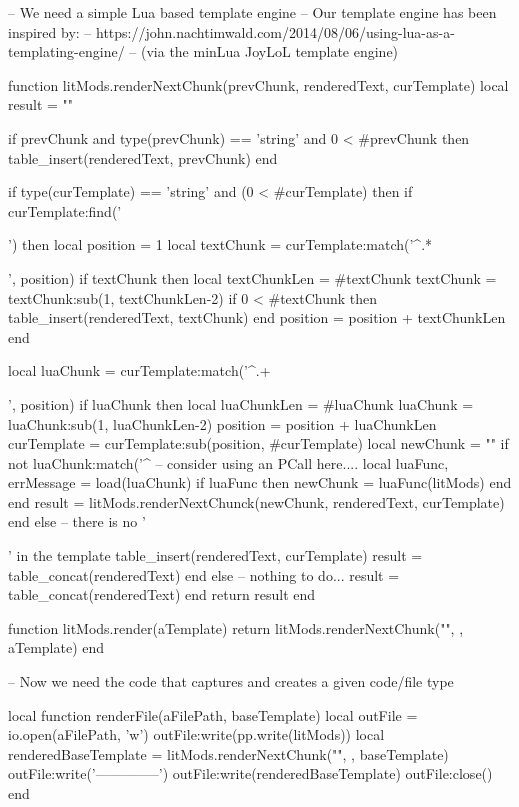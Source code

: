 
\startchapter[title=The Lua Rendering Engine]

\startLuaCode

-- We need a simple Lua based template engine
-- Our template engine has been inspired by:
--   https://john.nachtimwald.com/2014/08/06/using-lua-as-a-templating-engine/
-- (via the minLua JoyLoL template engine)

function litMods.renderNextChunk(prevChunk, renderedText, curTemplate)
  local result = ""
  
  if prevChunk
    and type(prevChunk) == 'string'
    and 0 < #prevChunk then
    table_insert(renderedText, prevChunk)
  end
  
  if type(curTemplate) == 'string' and (0 < #curTemplate) then
    if curTemplate:find('{{') then
      local position  = 1
      local textChunk = curTemplate:match('^.*{{', position)
      if textChunk then 
        local textChunkLen = #textChunk
        textChunk = textChunk:sub(1, textChunkLen-2)
        if 0 < #textChunk then table_insert(renderedText, textChunk) end
        position = position + textChunkLen
      end
      
      local luaChunk = curTemplate:match('^.+}}', position)
      if luaChunk then
        local luaChunkLen = #luaChunk
        luaChunk = luaChunk:sub(1, luaChunkLen-2)
        position = position + luaChunkLen
        curTemplate = curTemplate:sub(position, #curTemplate)
        local newChunk = ""
        if not luaChunk:match('^%
          -- consider using an PCall here....
          local luaFunc, errMessage = load(luaChunk)
          if luaFunc then
            newChunk = luaFunc(litMods)
          end
        end
        result = litMods.renderNextChunck(newChunk, renderedText, curTemplate)
      end
    else -- there is no '{{' in the template
      table_insert(renderedText, curTemplate)
      result = table_concat(renderedText)
    end
  else
    -- nothing to do...
    result = table_concat(renderedText)
  end
  return result
end

function litMods.render(aTemplate)
  return litMods.renderNextChunk("", { }, aTemplate)
end

-- Now we need the code that captures and creates a given code/file type 

local function renderFile(aFilePath, baseTemplate)
  local outFile = io.open(aFilePath, 'w')
  outFile:write(pp.write(litMods))
  local renderedBaseTemplate = litMods.renderNextChunk("", {}, baseTemplate)
  outFile:write('\n--------------\n')
  outFile:write(renderedBaseTemplate)
  outFile:close()
end

}}}}
